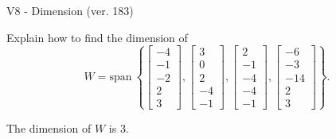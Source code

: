 \begin{exercise}
  \begin{exerciseTitle}V8 - Dimension (ver. 183)\end{exerciseTitle}
  \begin{exerciseStatement}
    Explain how to find the dimension of 
\[W=\mathrm{span}\ \left\{\left[\begin{array}{r}
-4 \\
-1 \\
-2 \\
2 \\
3
\end{array}\right] , \left[\begin{array}{r}
3 \\
0 \\
2 \\
-4 \\
-1
\end{array}\right] , \left[\begin{array}{r}
2 \\
-1 \\
-4 \\
-4 \\
-1
\end{array}\right] , \left[\begin{array}{r}
-6 \\
-3 \\
-14 \\
2 \\
3
\end{array}\right]\right\}.\]



  \end{exerciseStatement}
  \begin{exerciseAnswer}
   The dimension of \(W\) is  \(3\).
  


  \end{exerciseAnswer}
\end{exercise}